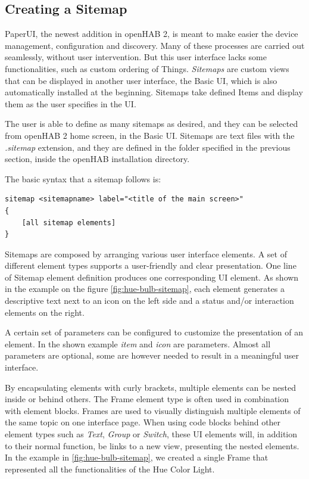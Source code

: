 \subsection{Creating a Sitemap}
PaperUI, the newest addition in openHAB 2, is meant to make easier the device management, configuration and discovery. Many of
these processes are carried out seamlessly, without user intervention. But this user interface lacks some functionalities, such as
custom ordering of Things. \textit{Sitemaps} are custom views that can be displayed in another user interface, the Basic UI, which
is also automatically installed at the beginning.\cite{openHABDocs} Sitemaps take defined Items and display them as the user specifies
in the UI.

The user is able to define as many sitemaps as desired, and they can be selected from openHAB 2 home screen, in the Basic UI. Sitemaps
are text files with the \textit{.sitemap} extension, and they are defined in the folder specified in the previous section, inside the
openHAB installation directory.

The basic syntax that a sitemap follows is:

\begin{lstlisting}[style=Consola]
sitemap <sitemapname> label="<title of the main screen>"
{
    [all sitemap elements]
}
\end{lstlisting}

Sitemaps are composed by arranging various user interface elements. A set of different element types supports a user-friendly and
clear presentation. One line of Sitemap element definition produces one corresponding UI element. As shown in the example on the
figure \ref{fig:hue-bulb-sitemap}, each element generates a descriptive text next to an icon on the left side and a status and/or
interaction elements on the right.

A certain set of parameters can be configured to customize the presentation of an element. In the shown example \textit{item} and
\textit{icon} are parameters. Almost all parameters are optional, some are however needed to result in a meaningful user interface.

By encapsulating elements with curly brackets, multiple elements can be nested inside or behind others. The Frame element type is
often used in combination with element blocks. Frames are used to visually distinguish multiple elements of the same topic on one
interface page. When using code blocks behind other element types such as \textit{Text}, \textit{Group} or \textit{Switch}, these UI
elements will, in addition to their normal function, be links to a new view, presenting the nested elements. In the example in
\ref{fig:hue-bulb-sitemap}, we created a single Frame that represented all the functionalities of the Hue Color Light.


